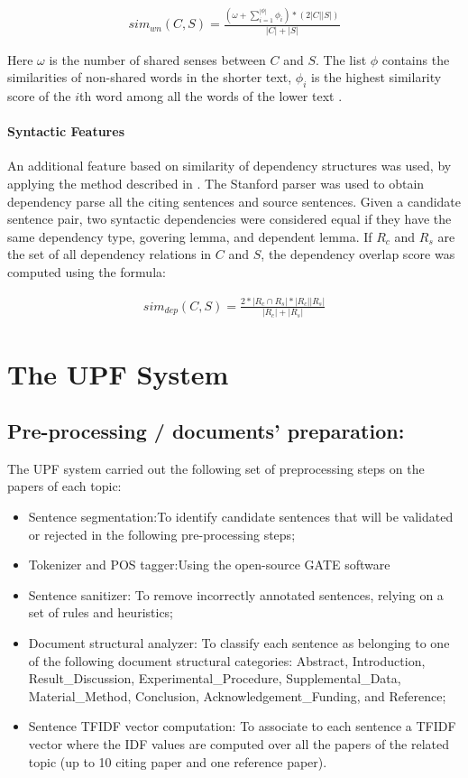 \documentclass[11pt]{article}
\begin{document}
\begin{eqnarray*}
  sim_{wn}(C,S) = \frac{(\omega + \sum_{i=1}^{|\phi|}\phi_i) * (2|C||S|)}{|C|+|S|}
\end{eqnarray*}

Here $\omega$ is the number of shared senses between $C$ and $S$. The list 
$\phi$ contains the similarities of non-shared words in the shorter text, 
$\phi_i$ is the highest similarity score of the $i$th word among all the 
words of the lower text \cite{S13-1017}. 

\paragraph{Syntactic Features} An additional feature based on similarity of 
dependency structures was used, by applying the method described in 
\cite{S13-1017}. The Stanford parser was used to obtain dependency parse all 
the citing sentences and source sentences. Given a candidate sentence pair, 
two syntactic dependencies were considered equal if they have the same 
dependency type, govering lemma, and dependent lemma. If $R_c$ and $R_s$ are 
the set of all dependency relations in $C$ and $S$, the dependency overlap 
score was computed using the formula:

\begin{eqnarray*}
  sim_{dep}(C,S) = \frac{2*|R_c \cap R_s| * |R_c||R_s|}{|R_c|+|R_s|}
\end{eqnarray*}


\section{The UPF System}
\subsection{Pre-processing / documents’ preparation:}
The UPF system carried out the following set of preprocessing steps on the 
papers of each topic:
\begin{itemize}
\item{Sentence segmentation:}To identify candidate sentences that will be 
validated or rejected in the following pre-processing steps;
\item{Tokenizer and POS tagger:}Using the open-source GATE software
\item{Sentence sanitizer:} To remove incorrectly annotated sentences, 
relying on a set of rules and heuristics;
\item{Document structural analyzer:} To classify each sentence as belonging 
to one of the following document structural categories: Abstract, 
Introduction, Result\_Discussion, Experimental\_Procedure, 
Supplemental\_Data, Material\_Method, Conclusion, Acknowledgement\_Funding, 
and Reference;
\item{Sentence TFIDF vector computation:} To associate to each sentence a 
TFIDF vector where the IDF values are computed over all the papers of the 
related topic (up to 10 citing paper and one reference paper).
\end{itemize}
\end{document}
